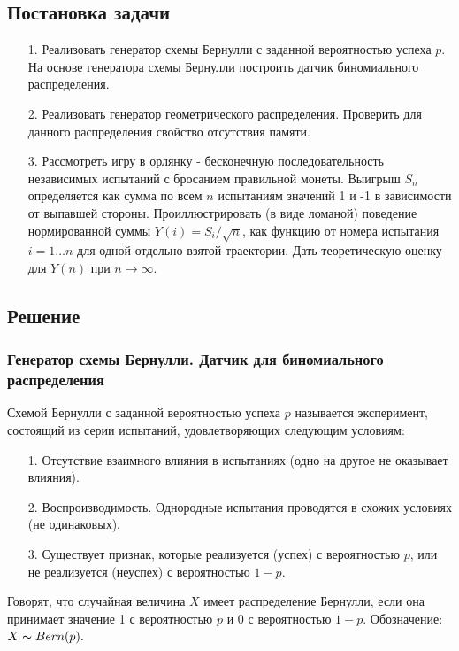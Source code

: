 \documentclass[11pt]{article}
\begin{document}
	\subsection{Постановка задачи}
	\begin{itemize}
		\item [1.]{Реализовать генератор схемы Бернулли с заданной вероятностью успеха $p$. На основе генератора схемы Бернулли построить датчик биномиального распределения. }
		\item [2.]{Реализовать генератор геометрического распределения. Проверить для данного распределения свойство отсутствия памяти.}
		\item [3.]{Рассмотреть игру в орлянку - бесконечную последовательность независимых испытаний с бросанием правильной монеты. Выигрыш $S_n$ определяется как сумма по всем $n$ испытаниям значений 1 и -1 в зависимости от выпавшей стороны. Проиллюстрировать (в виде ломаной) поведение нормированной суммы $Y(i) = S_i / \sqrt{n}$, как функцию от номера испытания $i = 1\dots n$ для одной отдельно взятой траектории. Дать теоретическую оценку для $Y(n)$ при $ n \rightarrow \infty.$  }
	\end{itemize}
    \subsection{Решение}
    \subsubsection{Генератор схемы Бернулли. Датчик для биномиального распределения}
    \begin{opr}
    	{Схемой Бернулли с заданной вероятностью успеха $p$ называется эксперимент, состоящий из серии испытаний, удовлетворяющих следующим условиям:}
    	\begin{itemize}
    		\item [1.]{Отсутствие взаимного влияния в испытаниях (одно на другое не оказывает влияния).}
    		\item [2.]{Воспроизводимость. Однородные испытания проводятся в схожих условиях (не одинаковых).}
    		\item [3.]{Существует признак, которые реализуется (успех) с вероятностью $p$, или не реализуется (неуспех) с вероятностью $1-p$.}
    	\end{itemize}
    \end{opr}
    
    \begin{opr}
    	Говорят, что случайная величина $X$ имеет распределение Бернулли, если она принимает значение 1 с вероятностью $p$ и 0 с вероятностью $1 - p$. Обозначение: $X \thicksim Bern(p).$
    \end{opr}
	
\end{document}
